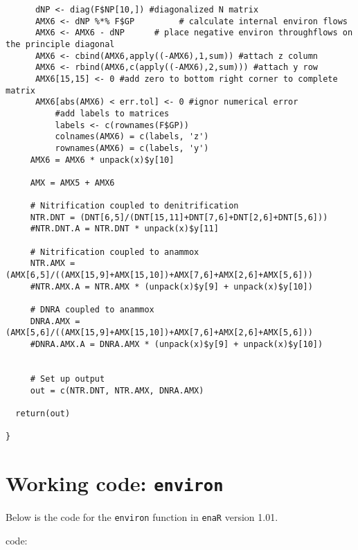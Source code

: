 \documentclass[]{article}
\begin{document}
\begin{verbatim}
      dNP <- diag(F$NP[10,]) #diagonalized N matrix
      AMX6 <- dNP %*% F$GP         # calculate internal environ flows
      AMX6 <- AMX6 - dNP      # place negative environ throughflows on the principle diagonal
      AMX6 <- cbind(AMX6,apply((-AMX6),1,sum)) #attach z column
      AMX6 <- rbind(AMX6,c(apply((-AMX6),2,sum))) #attach y row
      AMX6[15,15] <- 0 #add zero to bottom right corner to complete matrix
      AMX6[abs(AMX6) < err.tol] <- 0 #ignor numerical error
          #add labels to matrices
          labels <- c(rownames(F$GP))
          colnames(AMX6) = c(labels, 'z')
          rownames(AMX6) = c(labels, 'y')
	 AMX6 = AMX6 * unpack(x)$y[10]
	 
	 AMX = AMX5 + AMX6
	    
     # Nitrification coupled to denitrification
     NTR.DNT = (DNT[6,5]/(DNT[15,11]+DNT[7,6]+DNT[2,6]+DNT[5,6]))
     #NTR.DNT.A = NTR.DNT * unpack(x)$y[11]

     # Nitrification coupled to anammox
     NTR.AMX = (AMX[6,5]/((AMX[15,9]+AMX[15,10])+AMX[7,6]+AMX[2,6]+AMX[5,6]))
     #NTR.AMX.A = NTR.AMX * (unpack(x)$y[9] + unpack(x)$y[10])

     # DNRA coupled to anammox
     DNRA.AMX = (AMX[5,6]/((AMX[15,9]+AMX[15,10])+AMX[7,6]+AMX[2,6]+AMX[5,6]))
     #DNRA.AMX.A = DNRA.AMX * (unpack(x)$y[9] + unpack(x)$y[10])


     # Set up output
     out = c(NTR.DNT, NTR.AMX, DNRA.AMX)

  return(out)

}
\end{verbatim}


\section{Working code: \texttt{environ}}

Below is the code for the \texttt{environ} function in \texttt{enaR}
version 1.01.  

code:
\end{document}
